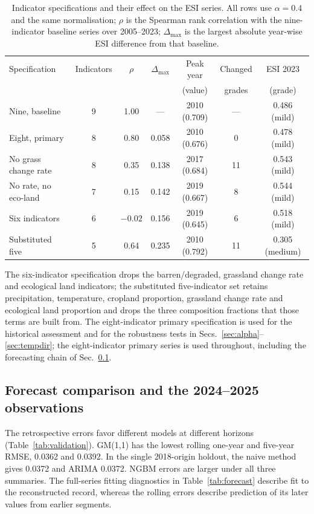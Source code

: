 \documentclass[preprint,11pt,authoryear]{elsarticle}
\begin{document}
\begin{table}[htbp]
\centering
\caption{Indicator specifications and their effect on the ESI series. All rows use $\alpha=0.4$ and the same normalisation; $\rho$ is the Spearman rank correlation with the nine-indicator baseline series over 2005--2023; $\Delta_{\max}$ is the largest absolute year-wise ESI difference from that baseline.}
\label{tab:deredundancy}
\small
\setlength{\tabcolsep}{4pt}
\begin{tabular}{lcccccc}
\toprule
Specification & Indicators & $\rho$ & $\Delta_{\max}$ & Peak year & Changed & ESI 2023 \\
 & & & & (value) & grades & (grade) \\
\midrule
Nine, baseline & 9 & 1.00 & --- & 2010 (0.709) & --- & 0.486 (mild) \\
Eight, primary & 8 & 0.80 & 0.058 & 2010 (0.676) & 0 & 0.478 (mild) \\
No grass change rate & 8 & 0.35 & 0.138 & 2017 (0.684) & 11 & 0.543 (mild) \\
No rate, no eco-land & 7 & 0.15 & 0.142 & 2019 (0.667) & 8 & 0.544 (mild) \\
Six indicators & 6 & $-0.02$ & 0.156 & 2019 (0.645) & 6 & 0.518 (mild) \\
Substituted five & 5 & 0.64 & 0.235 & 2010 (0.792) & 11 & 0.305 (medium) \\
\bottomrule
\end{tabular}

\vspace{2pt}
{\scriptsize The six-indicator specification drops the barren/degraded, grassland change rate and ecological land indicators; the substituted five-indicator set retains precipitation, temperature, cropland proportion, grassland change rate and ecological land proportion and drops the three composition fractions that those terms are built from. The eight-indicator primary specification is used for the historical assessment and for the robustness tests in Secs.~\ref{sec:alpha}--\ref{sec:tempdir}; the eight-indicator primary series is used throughout, including the forecasting chain of Sec.~\ref{sec:forecast}.}
\end{table}

\subsection{Forecast comparison and the 2024--2025 observations}
\label{sec:forecast}
The retrospective errors favor different models at different horizons (Table~\ref{tab:validation}). GM(1,1) has the lowest rolling one-year and five-year RMSE, 0.0362 and 0.0392. In the single 2018-origin holdout, the naive method gives 0.0372 and ARIMA 0.0372. NGBM errors are larger under all three summaries. The full-series fitting diagnostics in Table~\ref{tab:forecast} describe fit to the reconstructed record, whereas the rolling errors describe prediction of its later values from earlier segments.
\end{document}
